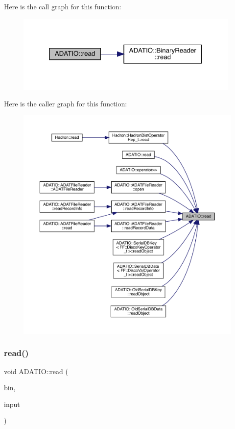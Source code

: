 Here is the call graph for this function\+:\nopagebreak
\begin{figure}[H]
\begin{center}
\leavevmode
\includegraphics[width=313pt]{d0/dba/namespaceADATIO_ab1b78a1922de3cc047517ead7aa99825_cgraph}
\end{center}
\end{figure}
Here is the caller graph for this function\+:\nopagebreak
\begin{figure}[H]
\begin{center}
\leavevmode
\includegraphics[width=350pt]{d0/dba/namespaceADATIO_ab1b78a1922de3cc047517ead7aa99825_icgraph}
\end{center}
\end{figure}
\mbox{\label{namespaceADATIO_a32f382a05f4fc1a3d423363f7964ae1f}} 
\subsubsection{\texorpdfstring{read()}{read()}\hspace{0.1cm}{\footnotesize\ttfamily [3/28]}}
{\footnotesize\ttfamily void A\+D\+A\+T\+I\+O\+::read (\begin{DoxyParamCaption}\item[{\mbox{\hyperlink{classADATIO_1_1BinaryReader}{Binary\+Reader}} \&}]{bin,  }\item[{char \&}]{input }\end{DoxyParamCaption})}

